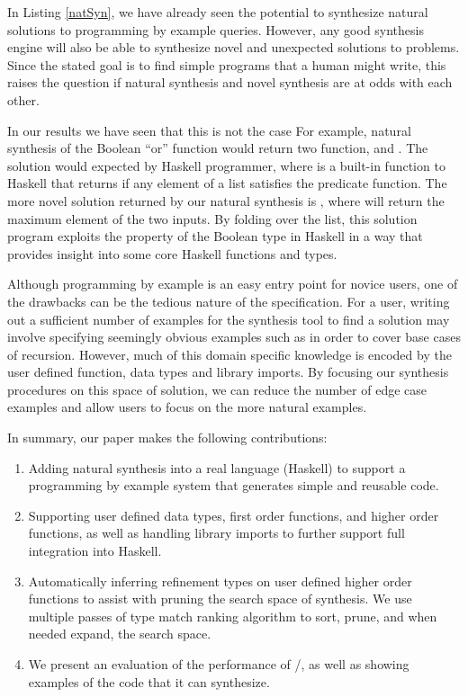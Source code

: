 In Listing \ref{natSyn}, we have already seen the potential to synthesize natural solutions to programming by example queries.
However, any good synthesis engine will also be able to synthesize novel and unexpected solutions to problems. 
Since the stated goal is to find simple programs that a human might write, this raises the question if natural synthesis and novel synthesis are at odds with each other.

In our results we have seen that this is not the case 
For example, natural synthesis of the Boolean ``or'' function would return two function,  and .
The  solution would expected by Haskell programmer, where  is a built-in function to Haskell that returns  if any element of a list satisfies the predicate function. 
The more novel solution returned by our natural synthesis is , where  will return the maximum element of the two inputs.
By folding over the list, this solution program exploits the  property of the Boolean type in Haskell in a way that provides insight into some core Haskell functions and types.

Although programming by example is an easy entry point for novice
users, one of the drawbacks can be the tedious nature of the
specification.  For a user, writing out a sufficient number of
examples for the synthesis tool to find a solution may involve
specifying seemingly obvious examples such as \codeinline{[]->[]} in
order to cover base cases of recursion.  However, much of this domain
specific knowledge is encoded by the user defined function, data types
and library imports.  By focusing our synthesis procedures on this
space of solution, we can reduce the number of edge case examples and
allow users to focus on the more natural examples.

In summary, our paper makes the following contributions:

\begin{enumerate}[topsep=0pt]
\item Adding natural synthesis into a real language (Haskell) to support a programming by example system that generates simple and reusable code.
\item Supporting user defined data types, first order functions, and higher order functions, as well as handling library imports to further support full integration into Haskell.
\item Automatically inferring refinement types on user defined higher order functions to assist with pruning the search space of synthesis. We use multiple passes of type match ranking algorithm to sort, prune, and when needed expand, the search space.
\item We present an evaluation of the performance of \ourTool/, as well as showing examples of the code that it can synthesize.
\end{enumerate}
